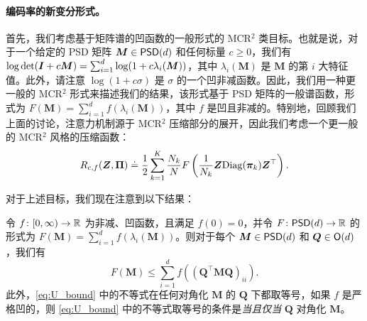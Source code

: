 \documentclass[../../book-main_zh.tex]{subfiles}
\begin{document}

\paragraph{编码率的新变分形式。} 首先，我们考虑基于矩阵谱的凹函数的一般形式的 MCR$^2$ 类目标。也就是说，对于一个给定的 PSD 矩阵 $\bm M \in \mathsf{PSD}(d)$ 和任何标量 $c \geq 0$，我们有 $\log \det (\bm{I} + c \bm M) = \sum_{i=1}^{d} \log( 1 + c \lambda_i(\bm M))$，其中 $\lambda_i (\bm M)$ 是 $\bm M$ 的第 $i$ 大特征值。此外，请注意 $\log(1 + c \sigma)$ 是 $\sigma$ 的一个凹非减函数。因此，我们用一种更一般的 MCR$^2$ 形式来描述我们的结果，该形式基于 PSD 矩阵的一般谱函数，形式为 $F(\bm M) = \sum_{i=1}^{d} f(\lambda_i(\bm M))$，其中 $f$ 是凹且非减的。特别地，回顾我们上面的讨论，注意力机制源于 MCR$^2$ 压缩部分的展开，因此我们考虑一个更一般的 MCR$^2$ 风格的压缩函数：
\vspace{-2mm}
\begin{equation}
    R_{c,f}(\bm Z, \bm \Pi) \doteq \frac{1}{2}\sum_{k=1}^K \frac{N_k}{N} F\left( \frac{1}{N_k}\bm{Z} \mathrm{Diag}(\bm \pi_k) \bm{Z}^{\top} \right).
    \label{eq:mcr_c_gen}
\end{equation}



对于上述目标，我们现在注意到以下结果：
\begin{theorem}
\label{thm:var_concave}
    令 \(f \colon [0, \infty) \to \mathbb{R}\) 为非减、凹函数，且满足 \(f(0) = 0\)，并令 \(F \colon \mathsf{PSD}(d) \to \mathbb{R}\) 的形式为 \(F(\bm M) = \sum_{i = 1}^{d}f(\lambda_{i}(\bm M))\)。则对于每个 \(\bm M \in \mathsf{PSD}(d)\) 和 \(\bm Q \in \mathsf{O}(d)\)，我们有
    \begin{equation}
        \label{eq:U_bound}
        F(\bm M) \leq  \sum_{i=1}^{d} f\left( (\bm Q^{\top} \bm M \bm Q)_{ii} \right).
    \end{equation}
    此外，\eqref{eq:U_bound} 中的不等式在任何对角化 $\bm M$ 的 $\bm Q$ 下都取等号，如果 $f$ 是严格凹的，则 \eqref{eq:U_bound} 中的不等式取等号的条件是\textit{当且仅当} $\bm Q$ 对角化 $\bm M$。
\end{theorem}
\end{document}
